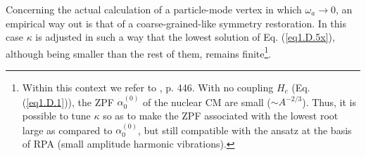 \begin{subappendices}
Concerning the actual calculation of a particle-mode vertex in which $\omega_a\rightarrow 0$, an empirical
way out is that of a coarse-grained-like symmetry restoration.
In this case $\kappa$ is adjusted in such a way that the lowest solution of Eq. (\ref{eq1.D.5x}), although
being smaller than the  rest of them, remains finite\footnote{Within this context we refer to \cite{Bohr:75}, p. 446. With no coupling $H_c$ (Eq. (\ref{eq1.D.1})), the  ZPF $\alpha^{(0)}_0$ of the nuclear CM are small ($\sim A^{-2/3}$). Thus, it is possible to tune $\kappa$ so as to make the ZPF associated with the lowest root large as compared to $\alpha^{(0)}_0$, but still compatible with the ansatz at the basis of RPA (small amplitude harmonic vibrations).}.


\end{subappendices}
